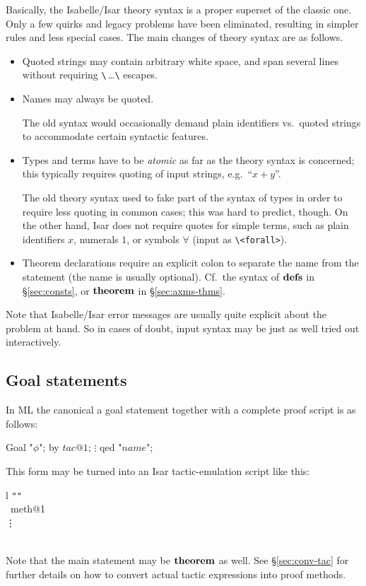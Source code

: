 Basically, the Isabelle/Isar theory syntax is a proper superset of the classic
one.  Only a few quirks and legacy problems have been eliminated, resulting in
simpler rules and less special cases.  The main changes of theory syntax are
as follows.

\begin{itemize}
\item Quoted strings may contain arbitrary white space, and span several lines
  without requiring \verb,\,\,\dots\verb,\, escapes.
\item Names may always be quoted.
  
  The old syntax would occasionally demand plain identifiers vs.\ quoted
  strings to accommodate certain syntactic features.
\item Types and terms have to be \emph{atomic} as far as the theory syntax is
  concerned; this typically requires quoting of input strings, e.g.\ ``$x +
  y$''.
  
  The old theory syntax used to fake part of the syntax of types in order to
  require less quoting in common cases; this was hard to predict, though.  On
  the other hand, Isar does not require quotes for simple terms, such as plain
  identifiers $x$, numerals $1$, or symbols $\forall$ (input as
  \verb,\<forall>,).
\item Theorem declarations require an explicit colon to separate the name from
  the statement (the name is usually optional).  Cf.\ the syntax of ${\mathord{\mathbf{defs}}}$ in
  \S\ref{sec:consts}, or ${\mathord{\mathbf{theorem}}}$ in \S\ref{sec:axms-thms}.
\end{itemize}

Note that Isabelle/Isar error messages are usually quite explicit about the
problem at hand.  So in cases of doubt, input syntax may be just as well tried
out interactively.


\subsection{Goal statements}\label{sec:conv-goal}

In ML the canonical a goal statement together with a complete proof script is
as follows:
\begin{ttbox}
 Goal "\(\phi\)";
 by \(tac@1\);
   \(\vdots\)
 qed "\(name\)";
\end{ttbox}
This form may be turned into an Isar tactic-emulation script like this:
\begin{matharray}{l}
  \texttt"{\phi}\texttt" \\
  \quad {}~meth@1 \\
  \qquad \vdots \\
  \quad {} \\
\end{matharray}
Note that the main statement may be ${\mathord{\mathbf{theorem}}}$ as well.  See
\S\ref{sec:conv-tac} for further details on how to convert actual tactic
expressions into proof methods.

